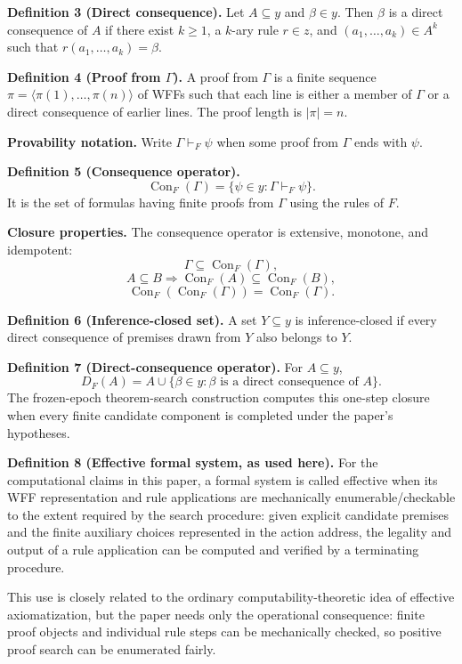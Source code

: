 \documentclass[11pt]{article}
\theoremstyle{hilberttheorem}
\begin{document}
\textbf{Definition 3 (Direct consequence).} Let $A\subseteq y$ and $\beta\in y$. Then $\beta$ is a direct consequence of $A$ if there exist $k\ge1$, a $k$-ary rule $r\in z$, and $(a_1,\ldots,a_k)\in A^k$ such that $r(a_1,\ldots,a_k)=\beta$.

\textbf{Definition 4 (Proof from $\Gamma$).} A proof from $\Gamma$ is a finite sequence $\pi=\langle\pi(1),\ldots,\pi(n)\rangle$ of WFFs such that each line is either a member of $\Gamma$ or a direct consequence of earlier lines. The proof length is $|\pi|=n$.

\textbf{Provability notation.} Write $\Gamma\vdash_F\psi$ when some proof from $\Gamma$ ends with $\psi$.

\textbf{Definition 5 (Consequence operator).}
\[
\operatorname{Con}_F(\Gamma)=\{\psi\in y:\Gamma\vdash_F\psi\}.
\]
It is the set of formulas having finite proofs from $\Gamma$ using the rules of $F$.

\textbf{Closure properties.} The consequence operator is extensive, monotone, and idempotent:
\[
\Gamma\subseteq\operatorname{Con}_F(\Gamma),
\]
\[
A\subseteq B\Longrightarrow\operatorname{Con}_F(A)\subseteq\operatorname{Con}_F(B),
\]
\[
\operatorname{Con}_F(\operatorname{Con}_F(\Gamma))=\operatorname{Con}_F(\Gamma).
\]

\textbf{Definition 6 (Inference-closed set).} A set $Y\subseteq y$ is inference-closed if every direct consequence of premises drawn from $Y$ also belongs to $Y$.

\textbf{Definition 7 (Direct-consequence operator).} For $A\subseteq y$,
\[
D_F(A)=A\cup\{\beta\in y:\beta\text{ is a direct consequence of }A\}.
\]
The frozen-epoch theorem-search construction computes this one-step closure when every finite candidate component is completed under the paper's hypotheses.

\textbf{Definition 8 (Effective formal system, as used here).} For the computational claims in this paper, a formal system is called effective when its WFF representation and rule applications are mechanically enumerable/checkable to the extent required by the search procedure: given explicit candidate premises and the finite auxiliary choices represented in the action address, the legality and output of a rule application can be computed and verified by a terminating procedure.

This use is closely related to the ordinary computability-theoretic idea of effective axiomatization, but the paper needs only the operational consequence: finite proof objects and individual rule steps can be mechanically checked, so positive proof search can be enumerated fairly.
\end{document}
